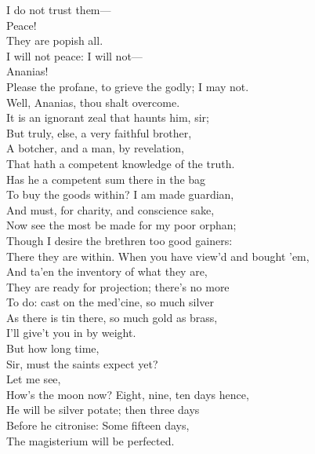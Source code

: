 \documentclass[a4paper,oneside]{memoir}
\begin{document}
\begin{drama*}
I do not trust them---\\
\tribulationspeaks {} Peace!\\
\ananiasspeaks {} They are popish all.\\
I will not peace: I will not---\\
\tribulationspeaks {} Ananias!\\
\ananiasspeaks Please the profane, to grieve the godly; I may not.\\
\subtlespeaks Well, Ananias, thou shalt overcome.\\
\tribulationspeaks It is an ignorant zeal that haunts him, sir;\\
But truly, else, a very faithful brother,\\
A botcher, and a man, by revelation,\\
That hath a competent knowledge of the truth.\\
\subtlespeaks Has he a competent sum there in the bag\\
To buy the goods within? I am made guardian,\\
And must, for charity, and conscience sake,\\
Now see the most be made for my poor orphan;\\
Though I desire the brethren too good gainers:\\
There they are within. When you have view'd and bought 'em,\\
And ta'en the inventory of what they are,\\
They are ready for projection; there's no more\\
To do: cast on the med'cine, so much silver\\
As there is tin there, so much gold as brass,\\
I'll give't you in by weight.\\
\tribulationspeaks {} But how long time,\\
Sir, must the saints expect yet?\\
\subtlespeaks {} Let me see,\\
How's the moon now? Eight, nine, ten days hence,\\
He will be silver potate; then three days\\
Before he citronise: Some fifteen days,\\
The magisterium will be perfected.\\

\end{drama*}
\end{document}
